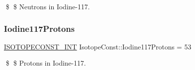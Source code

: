 \$ \$ Neutrons in Iodine-\/117. \mbox{\label{group___isotope_const-_iodine-_i117_ga377285ac769b8fc963f09ff019b9f17b}} 
\subsubsection{\texorpdfstring{Iodine117\+Protons}{Iodine117Protons}}
{\footnotesize\ttfamily \mbox{\hyperlink{group___isotope_const-_macros_ga5f18360b3e99483a35c32d789e62621c}{I\+S\+O\+T\+O\+P\+E\+C\+O\+N\+S\+T\+\_\+\+I\+NT}} Isotope\+Const\+::\+Iodine117\+Protons = 53}

\$ \$ Protons in Iodine-\/117. 